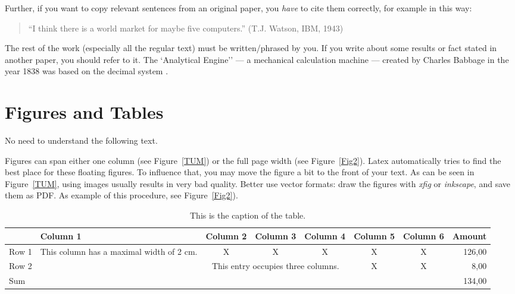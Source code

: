 \documentclass[A4,10pt]{article}
\begin{document}
Further, if you want to copy relevant sentences from an
original paper, you {\em have} to cite them correctly, for example
in this way:

\begin{quote}
	``I think there is a world market for maybe five computers.''
	(T.J. Watson, IBM, 1943)
\end{quote}

The rest of the work (especially all the regular text) must be
written/phrased by you. If you write about some results or fact
stated in another paper, you should refer to it.
The `Analytical Engine'' --- a mechanical calculation machine ---
created by Charles Babbage in the year 1838 was based on the decimal
system
\cite{Brom98}.

\section{Figures and Tables}

No need to understand the following text.

Figures can span either one column (see Figure~\ref{TUM}) or the full
page width (see Figure~\ref{Fig2}).
Latex automatically tries to find the best place for these floating
figures. To influence that, you may move the figure a bit to the front
of your text.
As can be seen in Figure~\ref{TUM}, using images usually results in very
bad quality. Better use vector formats: draw the figures with
{\em xfig} or {\em inkscape}, and save them as PDF. As example of
this procedure, see Figure~\ref{Fig2}).

\begin{table}

\begin{center}
\begin{tabular}{|l|p{2cm}|c|c|c|c|c|r|}
\hline
	& Column 1 & Column 2 & Column 3 & Column 4& Column 5& Column 6& 
Amount\\
\hline
Row 1 & This column has a maximal width of 2 cm.& X & X& X& X& X& 126,00\\
\hline
Row 2 & & \multicolumn{3}{p{5cm}|}{This entry occupies three columns.}& X &X 
& 8,00\\
\hline
\multicolumn{7}{|l}{Sum} &134,00\\
\hline
\end{tabular}
\end{center}

\caption{This is the caption of the table.}
\label{Tab1}

\end{table}
\end{document}
